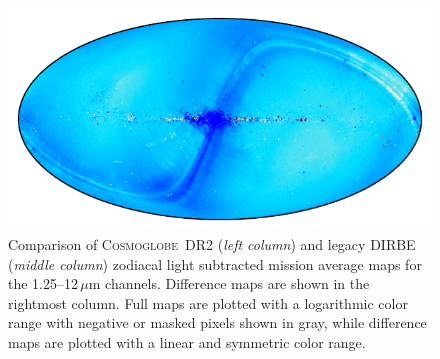 \documentclass{aa}
\def\Cosmoglobe{\textsc{Cosmoglobe}}
\begin{document}
\begin{figure}
        \includegraphics[width=0.33\linewidth]{figs/diff_CG_DIRBE_ZSMA_05_n256.pdf}
	\caption{Comparison of \Cosmoglobe\ DR2 (\emph{left column}) and legacy DIRBE (\emph{middle column}) zodiacal light subtracted mission average maps for the 1.25--12$\,\mu$m channels. Difference maps are shown in the rightmost column. Full maps are plotted with a logarithmic color range with negative or masked pixels shown in gray, while difference maps are plotted with a linear and symmetric color range.}
	\label{fig:freqmaps_cg_vs_dirbe1}
\end{figure}
\end{document}
